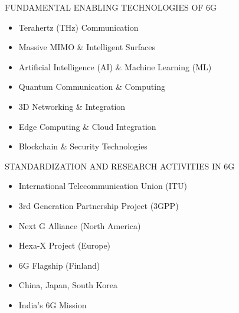 \documentclass{beamer}
\begin{document}
\begin{frame}{FUNDAMENTAL ENABLING TECHNOLOGIES OF 6G}
\begin{itemize}
    \item Terahertz (THz) Communication
    \item Massive MIMO \& Intelligent Surfaces
    \item Artificial Intelligence (AI) \& Machine Learning (ML)
    \item Quantum Communication \& Computing
    \item 3D Networking \& Integration
    \item Edge Computing \& Cloud Integration
    \item Blockchain \& Security Technologies
\end{itemize}   
\end{frame}

\begin{frame}{STANDARDIZATION AND RESEARCH ACTIVITIES IN 6G}
\begin{itemize}
    \item International Telecommunication Union (ITU)
    \item 3rd Generation Partnership Project (3GPP)
    \item Next G Alliance (North America)
    \item Hexa-X Project (Europe)
    \item 6G Flagship (Finland)
    \item China, Japan, South Korea
    \item India’s 6G Mission
\end{itemize}
\end{frame}
\end{document}
